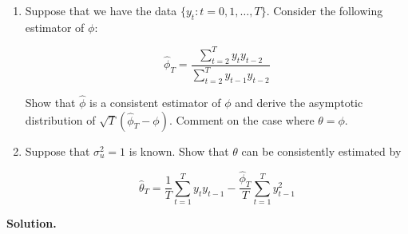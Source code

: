 \documentclass{article}
\begin{document}
\begin{enumerate}[(1)]

\item Suppose that we have the data \(\{y_t : t = 0, 1, \ldots, T\} \). Consider the following estimator of \(\phi\):

\[
\hat{\phi}_T = \frac{\sum_{t=2}^T y_t y_{t-2}}{\sum_{t=2}^T y_{t-1} y_{t-2}}
\]

Show that \(\hat{\phi}\) is a consistent estimator of \(\phi\) and derive the asymptotic distribution of \(\sqrt{T}(\hat{\phi}_T - \phi)\). Comment on the case where \(\theta = \phi\).

\item Suppose that \(\sigma_u^2 = 1\) is known. Show that \(\theta\) can be consistently estimated by 

\[
\hat{\theta}_T = \frac{1}{T} \sum_{t=1}^T y_t y_{t-1} - \frac{\hat{\phi}_T}{T}\sum_{t=1}^T y_{t-1}^2
\]

\end{enumerate}

\textbf{Solution.}
\end{document}
